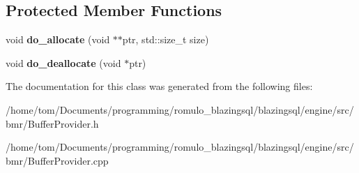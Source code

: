 \subsection*{Protected Member Functions}
\begin{DoxyCompactItemize}
\item 
\mbox{\label{classral_1_1memory_1_1host__allocator_abfbc162467e554aa0aa24e30face8c29}} 
void {\bfseries do\+\_\+allocate} (void $\ast$$\ast$ptr, std\+::size\+\_\+t size)
\item 
\mbox{\label{classral_1_1memory_1_1host__allocator_a2b60396db875066cecd2b744bf6877d1}} 
void {\bfseries do\+\_\+deallocate} (void $\ast$ptr)
\end{DoxyCompactItemize}


The documentation for this class was generated from the following files\+:\begin{DoxyCompactItemize}
\item 
/home/tom/\+Documents/programming/romulo\+\_\+blazingsql/blazingsql/engine/src/bmr/Buffer\+Provider.\+h\item 
/home/tom/\+Documents/programming/romulo\+\_\+blazingsql/blazingsql/engine/src/bmr/Buffer\+Provider.\+cpp\end{DoxyCompactItemize}

